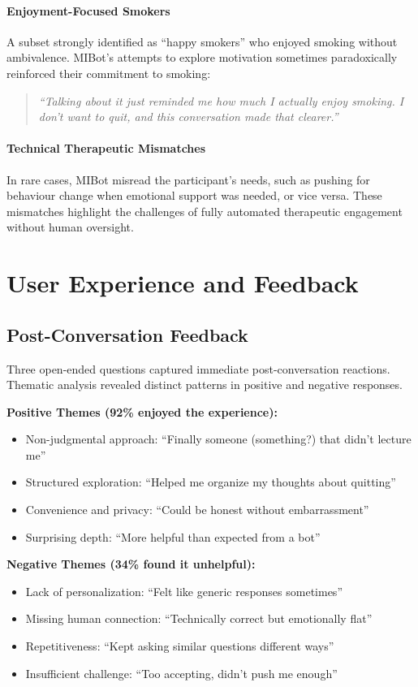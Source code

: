 \paragraph{Enjoyment-Focused Smokers}
A subset strongly identified as ``happy smokers'' who enjoyed smoking without ambivalence. MIBot's attempts to explore motivation sometimes paradoxically reinforced their commitment to smoking:

\begin{quote}
\textit{``Talking about it just reminded me how much I actually enjoy smoking. I don't want to quit, and this conversation made that clearer.''}
\end{quote}

\paragraph{Technical Therapeutic Mismatches}
In rare cases, MIBot misread the participant's needs, such as pushing for behaviour change when emotional support was needed, or vice versa. These mismatches highlight the challenges of fully automated therapeutic engagement without human oversight.

\section{User Experience and Feedback}
\label{sec:feedback}

\subsection{Post-Conversation Feedback}

Three open-ended questions captured immediate post-conversation reactions. Thematic analysis revealed distinct patterns in positive and negative responses.

\textbf{Positive Themes (92\% enjoyed the experience):}
\begin{itemize}
\item Non-judgmental approach: ``Finally someone (something?) that didn't lecture me''
\item Structured exploration: ``Helped me organize my thoughts about quitting''
\item Convenience and privacy: ``Could be honest without embarrassment''
\item Surprising depth: ``More helpful than expected from a bot''
\end{itemize}

\textbf{Negative Themes (34\% found it unhelpful):}
\begin{itemize}
\item Lack of personalization: ``Felt like generic responses sometimes''
\item Missing human connection: ``Technically correct but emotionally flat''
\item Repetitiveness: ``Kept asking similar questions different ways''
\item Insufficient challenge: ``Too accepting, didn't push me enough''
\end{itemize}


